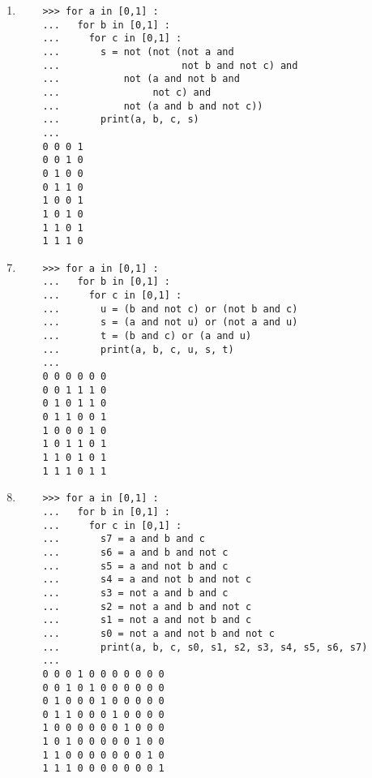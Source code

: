 \begin{description}
\begin{minipage}[t]{7.5cm}
\begin{enumerate}
	\begin{py}{12cm}
	\begin{verbatim}
	>>> for a in [0,1] :
	...   for b in [0,1] :
	...     for c in [0,1] :
	...       s = not (not (a and b) and 
	...           not (a and c) and 
	...           not (b and c))
	...       print(a, b, c, s)
	... 
	0 0 0 0
	0 0 1 0
	0 1 0 0
	0 1 1 1
	1 0 0 0
	1 0 1 1
	1 1 0 1
	1 1 1 1
	\end{verbatim}
	\end{py}

	\item
	
	\begin{py}{12cm}
	\begin{verbatim}
	>>> for a in [0,1] :
	...   for b in [0,1] :
	...     for c in [0,1] :
	...       s = not (not (not a and 
	...                     not b and not c) and 
	...           not (a and not b and 
	...                not c) and 
	...           not (a and b and not c))
	...       print(a, b, c, s)
	... 
	0 0 0 1
	0 0 1 0
	0 1 0 0
	0 1 1 0
	1 0 0 1
	1 0 1 0
	1 1 0 1
	1 1 1 0
	\end{verbatim}
	\end{py}
	\end{enumerate}
	\end{minipage}
	\hfill
	\begin{minipage}[t]{7.5cm}
	\begin{enumerate}\setcounter{enumi}{6}
	\item
	
	\begin{py}{12cm}
	\begin{verbatim}
	>>> for a in [0,1] :
	...   for b in [0,1] :
	...     for c in [0,1] :
	...       u = (b and not c) or (not b and c)
	...       s = (a and not u) or (not a and u)
	...       t = (b and c) or (a and u)
	...       print(a, b, c, u, s, t)
	... 
	0 0 0 0 0 0
	0 0 1 1 1 0
	0 1 0 1 1 0
	0 1 1 0 0 1
	1 0 0 0 1 0
	1 0 1 1 0 1
	1 1 0 1 0 1
	1 1 1 0 1 1
	\end{verbatim}
	\end{py}

	\item
	
	\begin{py}{12cm}
	\begin{verbatim}
	>>> for a in [0,1] :
	...   for b in [0,1] :
	...     for c in [0,1] :
	...       s7 = a and b and c
	...       s6 = a and b and not c
	...       s5 = a and not b and c
	...       s4 = a and not b and not c
	...       s3 = not a and b and c
	...       s2 = not a and b and not c
	...       s1 = not a and not b and c
	...       s0 = not a and not b and not c
	...       print(a, b, c, s0, s1, s2, s3, s4, s5, s6, s7)
	... 
	0 0 0 1 0 0 0 0 0 0 0
	0 0 1 0 1 0 0 0 0 0 0
	0 1 0 0 0 1 0 0 0 0 0
	0 1 1 0 0 0 1 0 0 0 0
	1 0 0 0 0 0 0 1 0 0 0
	1 0 1 0 0 0 0 0 1 0 0
	1 1 0 0 0 0 0 0 0 1 0
	1 1 1 0 0 0 0 0 0 0 1
	\end{verbatim}
	\end{py}
	\end{enumerate}
	\end{minipage}


\end{description}
